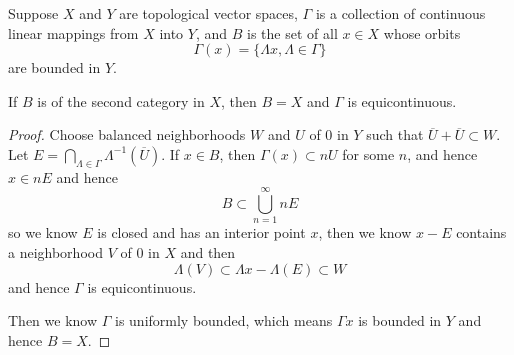 \begin{theorem}
    Suppose $X$ and $Y$ are topological vector spaces, $\Gamma$ is a collection of continuous linear mappings from $X$ into $Y$, and $B$ is the set of all $x\in X$ whose orbits \[\Gamma(x) = \{\Lambda x, \Lambda \in \Gamma\}\]are bounded in $Y$.\par
    If $B$ is of the second category in $X$, then $B = X$ and $\Gamma$ is equicontinuous.
\end{theorem}
\begin{proof}
    Choose balanced neighborhoods $W$ and $U$ of $0$ in $Y$ such that $\overline{U}+\overline{U} \subset W$. Let $E = \bigcap_{\Lambda \in \Gamma}\Lambda^{-1}(\overline{U})$. If $x\in B$, then $\Gamma(x) \subset nU$ for some $n$, and hence $x\in nE$ and hence
    \[
    B \subset \bigcup_{n=1}^{\infty} nE
    \]
    so we know $E$ is closed and has an interior point $x$, then we know $x - E$ contains a neighborhood $V$ of $0$ in $X$ and then
    \[\Lambda (V) \subset \Lambda x - \Lambda(E) \subset W
    \]
    and hence $\Gamma$ is equicontinuous.\par
    Then we know $\Gamma$ is uniformly bounded, which means $\Gamma x$ is bounded in $Y$ and hence $B = X$.
\end{proof}
